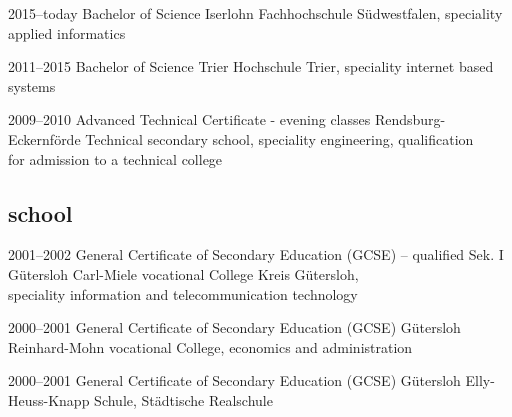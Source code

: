 \documentclass[]{friggeri-cv} %
\begin{document}
\begin{entrylist}


\entry
{2015--today}
{Bachelor of Science {\normalfont}}
{Iserlohn}
{Fachhochschule Südwestfalen, speciality applied informatics}


\entry
{2011--2015}
{Bachelor of Science {\normalfont}}
{Trier}
{Hochschule Trier, speciality internet based systems}


\entry
{2009--2010}
{Advanced Technical Certificate {\normalfont - evening classes}}
{Rendsburg-Eckernförde}
{Technical secondary school, speciality engineering, qualification\\
for admission to a technical college}


\end{entrylist}

\subsection{school}
\begin{entrylist}

\entry
{2001--2002}
{General Certificate of Secondary Education (GCSE) {\normalfont – qualified Sek. I}}
{Gütersloh}
{Carl-Miele vocational College Kreis Gütersloh, \\speciality information and telecommunication technology}


\entry
{2000--2001}
{General Certificate of Secondary Education (GCSE){\normalfont}}
{Gütersloh}
{Reinhard-Mohn vocational College, economics and administration}


\entry
{2000--2001}
{General Certificate of Secondary Education (GCSE){\normalfont}}
{Gütersloh}
{Elly-Heuss-Knapp Schule, Städtische Realschule }


\end{entrylist}

\end{document}
